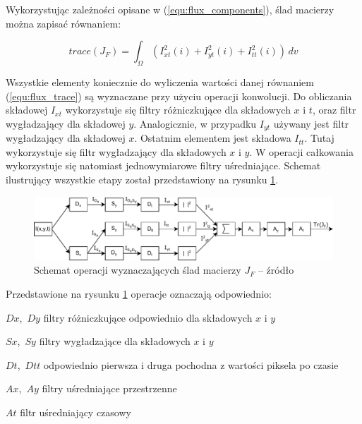 Wykorzystując zależności opisane w (\ref{equ:flux_components}), ślad macierzy można zapisać równaniem:

\begin{equation}
	trace(J_F) = \int_\Omega \left(I_{xt}^2(i) + I_{yt}^2(i) + I_{tt}^2(i)\right)\,dv
\label{equ:flux_trace}
\end{equation}

Wszystkie elementy koniecznie do wyliczenia wartości danej równaniem (\ref{equ:flux_trace}) są wyznaczane przy użyciu operacji konwolucji. Do obliczania składowej $I_{xt}$ wykorzystuje się filtry różniczkujące dla składowych $x$ i $t$, oraz filtr wygładzający dla składowej $y$. Analogicznie, w przypadku $I_{yt}$ używany jest filtr wygładzający dla składowej $x$. Ostatnim elementem jest składowa $I_{tt}$. Tutaj wykorzystuje się filtr wygładzający dla składowych $x$ i $y$. W operacji całkowania wykorzystuje się natomiast jednowymiarowe filtry uśredniające. Schemat ilustrujący wszystkie etapy został przedstawiony na rysunku \ref{fig:flux_operation_flow}.

    \begin{figure}[h!]
	\centering
	    \includegraphics[scale=0.8]{img/3/flux_operation_flow.pdf}
	    \caption{Schemat operacji wyznaczających ślad macierzy $J_F$ -- źródło \cite{janus_15}}
	\label{fig:flux_operation_flow}
    \end{figure} 

\noindent Przedstawione na rysunku \ref{fig:flux_operation_flow} operacje oznaczają odpowiednio: 
\begin{eqwhere}[2cm]
	\item[$Dx$,\  $Dy$] filtry różniczkujące odpowiednio dla składowych $x$ i $y$
	\item[$Sx$,\  $Sy$] filtry wygładzające dla składowych $x$ i $y$
	\item[$Dt$,\  $Dtt$] odpowiednio pierwsza i druga pochodna z wartości piksela po czasie
	\item[$Ax$,\  $Ay$] filtry uśredniające przestrzenne
	\item[$At$] filtr uśredniający czasowy\\
\end{eqwhere}

